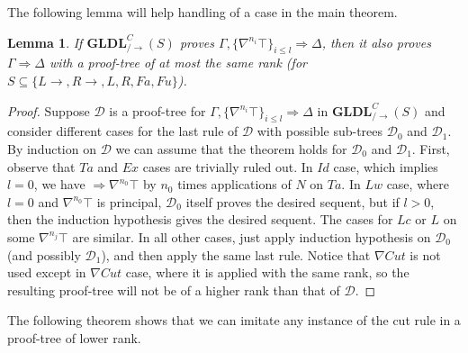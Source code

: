 \documentclass[12pt,a4paper]{article}
\theoremstyle{plain}
\newtheorem{lem}[thm]{Lemma}
\theoremstyle{definition}
\begin{document}
The following lemma will help handling of a case in the main theorem.

\begin{lem}\label{lem:ldls-top-redundant} If $\mathbf{GLDL}^C_{/\rightarrow}(S)$ proves $\Gamma , \{\nabla^{n_i} \top\}_{i \leq l} \Rightarrow \Delta$, then it also proves $\Gamma \Rightarrow \Delta$ with a proof-tree of at most the same rank (for $S \subseteq \{L\rightarrow, R\rightarrow, L, R, Fa, Fu\}$).
\end{lem}
\begin{proof}
Suppose $\mathcal{D}$ is a proof-tree for $\Gamma , \{\nabla^{n_i} \top\}_{i \leq l} \Rightarrow \Delta$ in $\mathbf{GLDL}_{/\rightarrow}^C(S)$ and consider different cases for the last rule of $\mathcal{D}$ with possible sub-trees $\mathcal{D}_0$ and $\mathcal{D}_1$.
By induction on $\mathcal{D}$ we can assume that the theorem holds for $\mathcal{D}_0$ and $\mathcal{D}_1$.
First, observe that $Ta$ and $Ex$ cases are trivially ruled out. In $Id$ case, which implies $l = 0$, we have $\Rightarrow \nabla^{n_0} \top$ by $n_0$ times applications of $N$ on $Ta$. In $Lw$ case, where $l = 0$ and $\nabla^{n_0} \top$ is principal, $\mathcal{D}_0$ itself proves the desired sequent, but if $l > 0$, then the induction hypothesis gives the desired sequent. The cases for $Lc$ or $L$ on some $\nabla^{n_j} \top$  are similar. In all other cases, just apply induction hypothesis on $\mathcal{D}_0$ (and possibly $\mathcal{D}_1$), and then apply the same last rule. Notice that $\nabla Cut$ is not used except in $\nabla Cut$ case, where it is applied with the same rank, so the resulting proof-tree will not be of a higher rank than that of $\mathcal{D}$.
\end{proof}

The following theorem shows that we can imitate any instance of the cut rule in a proof-tree of lower rank.
\end{document}
